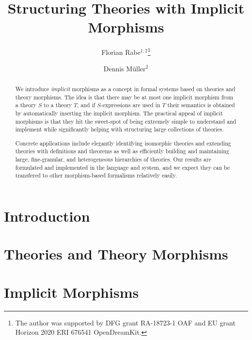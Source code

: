 \documentclass[orivec]{llncs}
\begin{document}
\title{Structuring Theories with Implicit Morphisms}
\author{Florian Rabe$^{1,2}$\thanks{The author was supported by DFG grant RA-18723-1 OAF and EU grant Horizon 2020 ERI 676541 OpenDreamKit.} \and Dennis M\"uller$^2$}
\maketitle

\begin{abstract}
We introduce \emph{implicit} morphisms as a concept in formal systems based on theories and theory morphisms.
The idea is that there may be at most one implicit morphism from a theory $S$ to a theory $T$, and if $S$-expressions are used in $T$ their semantics is obtained by automatically inserting the implicit morphism.
The practical appeal of implicit morphisms is that they hit the sweet-spot of being extremely simple to understand and implement while significantly helping with structuring large collections of theories.

Concrete applications include elegantly identifying isomorphic theories and extending theories with definitions and theorems as well as efficiently building and maintaining large, fine-granular, and heterogeneous hierarchies of theories.
Our results are formulated and implemented in the \mmt language and system, and we expect they can be transfered to other morphism-based formalisms relatively easily.
\end{abstract}


\section{Introduction}


\section{Theories and Theory Morphisms}\label{sec:mmt}


%

\section{Implicit Morphisms}\label{sec:impl}

\end{document}
